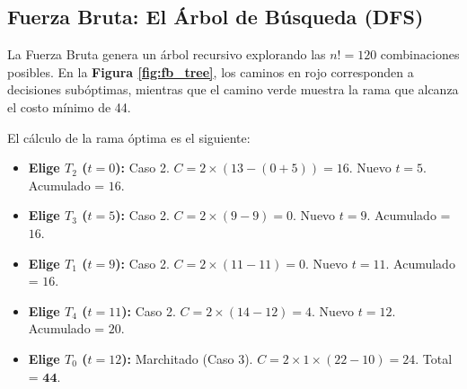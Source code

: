 \documentclass[conference, a4paper]{IEEEtran}
\begin{document}
\subsection{Fuerza Bruta: El Árbol de Búsqueda (DFS)}
La Fuerza Bruta genera un árbol recursivo explorando las $n! = 120$ combinaciones posibles. En la \textbf{Figura \ref{fig:fb_tree}}, los caminos en rojo corresponden a decisiones subóptimas, mientras que el camino verde muestra la rama que alcanza el costo mínimo de 44.

El cálculo de la rama óptima es el siguiente:
\begin{itemize}
    \item \textbf{Elige $T_2$ ($t=0$):} Caso 2. $C = 2 \times (13 - (0+5)) = 16$. Nuevo $t=5$. Acumulado = $16$.
    \item \textbf{Elige $T_3$ ($t=5$):} Caso 2. $C = 2 \times (9 - 9) = 0$. Nuevo $t=9$. Acumulado = $16$.
    \item \textbf{Elige $T_1$ ($t=9$):} Caso 2. $C = 2 \times (11 - 11) = 0$. Nuevo $t=11$. Acumulado = $16$.
    \item \textbf{Elige $T_4$ ($t=11$):} Caso 2. $C = 2 \times (14 - 12) = 4$. Nuevo $t=12$. Acumulado = $20$.
    \item \textbf{Elige $T_0$ ($t=12$):} Marchitado (Caso 3). $C = 2 \times 1 \times (22 - 10) = 24$. Total = $\mathbf{44}$.
\end{itemize}
\end{document}
